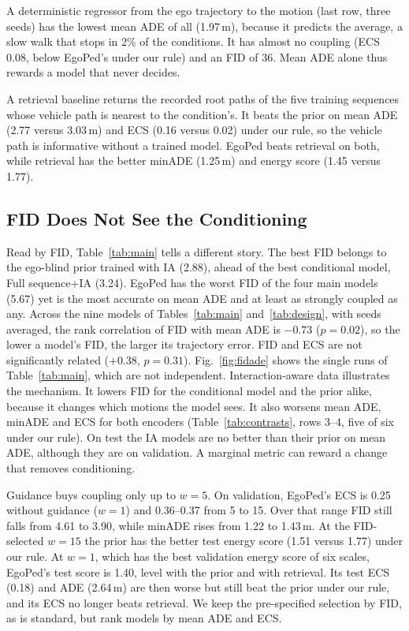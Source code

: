 \documentclass[letterpaper, 10 pt, conference]{ieeeconf}
\newcommand{\method}{EgoPed\xspace}
\newcommand{\fullseq}{Full sequence\xspace}
\begin{document}
A deterministic regressor from the ego trajectory to the motion (last row, three seeds) has the lowest mean ADE of all (1.97\,m), because it predicts the average, a slow walk that stops in 2\% of the conditions. It has almost no coupling (ECS 0.08, below \method's under our rule) and an FID of 36. Mean ADE alone thus rewards a model that never decides.

A retrieval baseline returns the recorded root paths of the five training sequences whose vehicle path is nearest to the condition's. It beats the prior on mean ADE (2.77 versus 3.03\,m) and ECS (0.16 versus 0.02) under our rule, so the vehicle path is informative without a trained model. \method beats retrieval on both, while retrieval has the better minADE (1.25\,m) and energy score (1.45 versus 1.77).

\subsection{FID Does Not See the Conditioning}
\label{sec:fid}

Read by FID, Table~\ref{tab:main} tells a different story. The best FID belongs to the ego-blind prior trained with IA (2.88), ahead of the best conditional model, \fullseq+IA (3.24). \method has the worst FID of the four main models (5.67) yet is the most accurate on mean ADE and at least as strongly coupled as any. Across the nine models of Tables~\ref{tab:main} and~\ref{tab:design}, with seeds averaged, the rank correlation of FID with mean ADE is $-0.73$ ($p = 0.02$), so the lower a model's FID, the larger its trajectory error. FID and ECS are not significantly related ($+0.38$, $p = 0.31$). Fig.~\ref{fig:fidade} shows the single runs of Table~\ref{tab:main}, which are not independent. Interaction-aware data illustrates the mechanism. It lowers FID for the conditional model and the prior alike, because it changes which motions the model sees. It also worsens mean ADE, minADE and ECS for both encoders (Table~\ref{tab:contrasts}, rows 3--4, five of six under our rule). On test the IA models are no better than their prior on mean ADE, although they are on validation. A marginal metric can reward a change that removes conditioning.

Guidance buys coupling only up to $w{=}5$. On validation, \method's ECS is 0.25 without guidance ($w{=}1$) and \mbox{0.36--0.37} from 5 to 15. Over that range FID still falls from 4.61 to 3.90, while minADE rises from 1.22 to 1.43\,m. At the FID-selected $w{=}15$ the prior has the better test energy score (1.51 versus 1.77) under our rule. At $w{=}1$, which has the best validation energy score of six scales, \method's test score is 1.40, level with the prior and with retrieval. Its test ECS (0.18) and ADE (2.64\,m) are then worse but still beat the prior under our rule, and its ECS no longer beats retrieval. We keep the pre-specified selection by FID, as is standard, but rank models by mean ADE and ECS.
\end{document}
